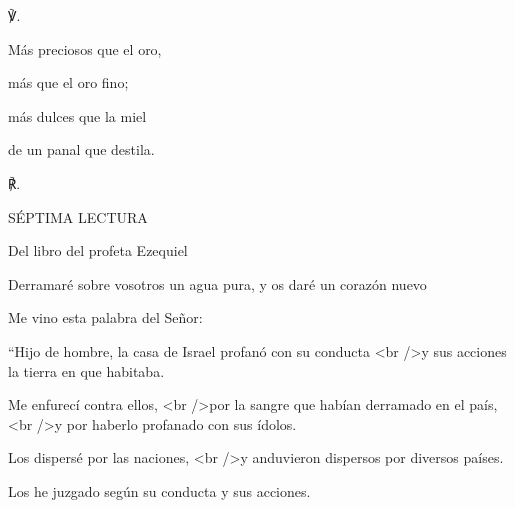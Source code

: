 			\begin{readbody}\begin{readred}℣.\end{readred} Más preciosos que el oro, \end{readbody}
			
			\begin{readtabbed}más que el oro fino; \end{readtabbed}
			
			\begin{readtabbed}más dulces que la miel \end{readtabbed}
			
			\begin{readtabbed}de un panal que destila. \begin{readred}℟.\end{readred}\end{readtabbed}
			
			\begin{readtitle}SÉPTIMA LECTURA\end{readtitle}
			
			\begin{readbook}Del libro del profeta Ezequiel \end{readbook}
			
			\begin{readtheme}Derramaré sobre vosotros un agua pura, y os daré un corazón nuevo\end{readtheme}
			
			\begin{readbody}Me vino esta palabra del Señor: \end{readbody}
			
			\begin{readtalk}“Hijo de hombre, la casa de Israel profanó con su conducta <br />y sus acciones la tierra en que habitaba. \end{readtalk}
			
			\begin{readtalk}Me enfurecí contra ellos, <br />por la sangre que habían derramado en el país, <br />y por haberlo profanado con sus ídolos. \end{readtalk}
			
			\begin{readtalk}Los dispersé por las naciones, <br />y anduvieron dispersos por diversos países. \end{readtalk}
			
			\begin{readtalk}Los he juzgado según su conducta y sus acciones. \end{readtalk}
			
